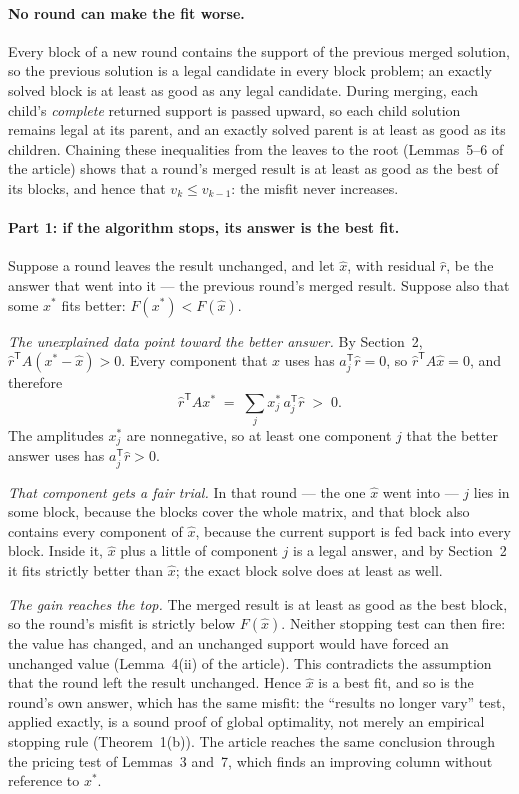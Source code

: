 \documentclass[pdflatex,sn-mathphys-num]{sn-jnl}
\newcommand{\T}{{\mathsf T}}
\begin{document}
\paragraph{No round can make the fit worse.}
Every block of a new round contains the support of the previous merged
solution, so the previous solution is a legal candidate in every block
problem; an exactly solved block is at least as good as any legal
candidate. During merging, each child's \emph{complete} returned
support is passed upward, so each child solution remains legal at its
parent, and an exactly solved parent is at least as good as its
children. Chaining these inequalities from the leaves to the root
(Lemmas~5--6 of the article) shows that a round's merged result is at
least as good as the best of its blocks, and hence that
$v_k\le v_{k-1}$: the misfit never increases.

\paragraph{Part 1: if the algorithm stops, its answer is the best fit.}
Suppose a round leaves the result unchanged, and let $\hat x$, with
residual $\hat r$, be the answer that went into it --- the previous
round's merged result. Suppose also that some $x^*$ fits better:
$F(x^*)<F(\hat x)$.

\emph{The unexplained data point toward the better answer.} By
Section~2, $\hat r^{\T}A(x^*-\hat x)>0$. Every component that $\hat x$
uses has $a_j^{\T}\hat r=0$, so $\hat r^{\T}A\hat x=0$, and therefore
\begin{equation*}
\hat r^{\T}Ax^*\;=\;\sum_j x^*_j\,a_j^{\T}\hat r\;>\;0 .
\end{equation*}
The amplitudes $x^*_j$ are nonnegative, so at least one component $j$
that the better answer uses has $a_j^{\T}\hat r>0$.

\emph{That component gets a fair trial.} In that round --- the one
$\hat x$ went into --- $j$ lies in some block, because the blocks cover the whole matrix, and that
block also contains every component of $\hat x$, because the current
support is fed back into every block. Inside it, $\hat x$ plus a little
of component $j$ is a legal answer, and by Section~2 it fits strictly
better than $\hat x$; the exact block solve does at least as well.

\emph{The gain reaches the top.} The merged result is at least as good
as the best block, so the round's misfit is strictly below
$F(\hat x)$. Neither stopping test can then fire: the value has
changed, and an unchanged support would have forced an unchanged value
(Lemma~4(ii) of the article). This contradicts the assumption that the
round left the result unchanged. Hence $\hat x$ is a best fit, and so
is the round's own answer, which has the same misfit: the ``results no
longer vary'' test, applied exactly, is a sound proof of global optimality,
not merely an empirical stopping rule (Theorem~1(b)). The article
reaches the same conclusion through the pricing test of Lemmas~3
and~7, which finds an improving column without reference to $x^*$.
\end{document}
